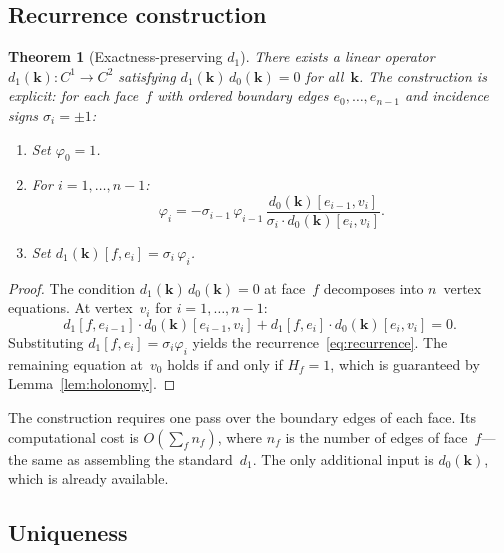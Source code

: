 \documentclass[preprint,12pt]{elsarticle}
\newtheorem{theorem}{Theorem}
\begin{document}
\subsection{Recurrence construction}

\begin{theorem}[Exactness-preserving $d_1$]\label{thm:exact}
There exists a linear operator $d_1(\mathbf{k})\colon C^1 \to C^2$ satisfying $d_1(\mathbf{k})\,d_0(\mathbf{k}) = 0$ for all~$\mathbf{k}$. The construction is explicit: for each face~$f$ with ordered boundary edges $e_0, \ldots, e_{n-1}$ and incidence signs $\sigma_i = \pm 1$:
\begin{enumerate}
  \item Set $\varphi_0 = 1$.
  \item For $i = 1, \ldots, n{-}1$:
  \begin{equation}\label{eq:recurrence}
    \varphi_i = -\sigma_{i-1}\,\varphi_{i-1}\,\frac{d_0(\mathbf{k})[e_{i-1}, v_i]}{\sigma_i \cdot d_0(\mathbf{k})[e_i, v_i]}.
  \end{equation}
  \item Set $d_1(\mathbf{k})[f, e_i] = \sigma_i\,\varphi_i$.
\end{enumerate}
\end{theorem}

\begin{proof}
The condition $d_1(\mathbf{k})\,d_0(\mathbf{k}) = 0$ at face~$f$ decomposes into $n$~vertex equations. At vertex~$v_i$ for $i = 1, \ldots, n{-}1$:
\begin{equation}
  d_1[f, e_{i-1}] \cdot d_0(\mathbf{k})[e_{i-1}, v_i] + d_1[f, e_i] \cdot d_0(\mathbf{k})[e_i, v_i] = 0.
\end{equation}
Substituting $d_1[f, e_i] = \sigma_i\varphi_i$ yields the recurrence~\eqref{eq:recurrence}. The remaining equation at~$v_0$ holds if and only if $H_f = 1$, which is guaranteed by Lemma~\ref{lem:holonomy}.
\end{proof}

The construction requires one pass over the boundary edges of each face. Its computational cost is $O(\sum_f n_f)$, where $n_f$ is the number of edges of face~$f$---the same as assembling the standard~$d_1$. The only additional input is $d_0(\mathbf{k})$, which is already available.

\subsection{Uniqueness}
\end{document}
